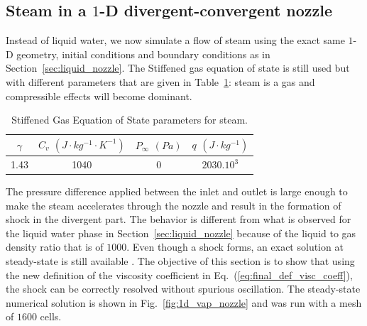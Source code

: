 \documentclass[preprint,10pt]{elsarticle}
\newcommand{\eqt}[1]{Eq.~(\ref{#1})}                     %
\newcommand{\fig}[1]{Fig.~\ref{#1}}                      %
\newcommand{\tbl}[1]{Table~\ref{#1}}                     %
\newcommand{\sct}[1]{Section~\ref{#1}}                   %
\begin{document}
\subsection{Steam in a $1$-D divergent-convergent nozzle} \label{sec:steam_nozzle}
Instead of liquid water, we now simulate a flow of steam using the exact same $1$-D geometry, initial conditions and boundary conditions as in \sct{sec:liquid_nozzle}. The Stiffened gas equation of state is still used but with different parameters that are given in \tbl{tbl:stff_gas_eos_vap}: steam is a gas and compressible effects will become dominant. 
\begin{table}[H]
\begin{center}
 \caption{\label{tbl:stff_gas_eos_vap} Stiffened Gas Equation of State parameters for steam.}
 \begin{tabular}{|c|c|c|c|}
 \hline
$\gamma$ & $C_v$ $(J\cdot kg^{-1} \cdot K^{-1})$ & $P_{\infty}$ $(Pa)$ & $q$ $(J \cdot kg^{-1})$ \\
 \hline
1.43 & 1040 & 0 & $2030.10^3$   \\
 \hline
\end{tabular}
\end{center}
\end{table}
The pressure difference applied between the inlet and outlet is large enough to make the steam accelerates through the nozzle and result in the formation of shock in the divergent part. The behavior is different from what is observed for the liquid water phase in \sct{sec:liquid_nozzle} because of the liquid to gas density ratio that is of $1000$. Even though a shock forms, an exact solution at steady-state is still available \cite{nozzle_exact}. The objective of this section is to show that using the new definition of the viscosity coefficient in \eqt{eq:final_def_visc_coeff}, the shock can be correctly resolved without spurious oscillation. The steady-state numerical solution is shown in \fig{fig:1d_vap_nozzle} and was run with a mesh of $1600$ cells.
\end{document}
